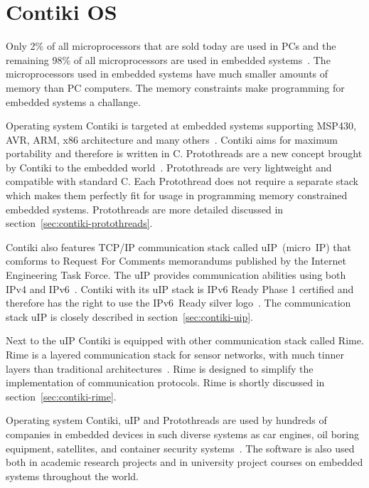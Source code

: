 
\chapter{Contiki OS}
Only 2\% of all microprocessors that are sold today are used in PCs and the remaining 98\%
of all microprocessors are used in embedded systems~\cite{thesis-programming}.
The microprocessors
used in embedded systems have much smaller amounts of memory than PC computers.
The memory constraints make programming for embedded systems a challange.

Operating system Contiki is targeted at embedded systems supporting MSP430, AVR, ARM, x86
architecture and many others~\cite{contiki-docs}.
Contiki aims for maximum portability and therefore is written in C.
Protothreads are a new concept brought by Contiki to the embedded world~\cite{paper-protothreads}.
Protothreads are very lightweight and compatible with standard C.
Each Protothread does not require a separate stack which makes them perfectly
fit for usage in programming memory constrained embedded systems.
Protothreads are more detailed discussed in section~\ref{sec:contiki-protothreads}.

Contiki also features TCP/IP communication stack called uIP~(micro~IP)
that comforms to Request For Comments memorandums published by the Internet Engineering Task Force.
The uIP provides communication abilities using both IPv4 and IPv6~\cite{contiki-docs}.
Contiki with its uIP stack is IPv6 Ready Phase 1 certified
and therefore has the right to use the IPv6~Ready silver logo~\cite{ipv6ready-db}.
The communication stack uIP is closely described in section~\ref{sec:contiki-uip}.

Next to the uIP Contiki is equipped with other communication stack called Rime.
Rime is a layered communication stack for sensor networks,
with much tinner layers than traditional architectures~\cite{paper-rime}.
Rime is designed to simplify the implementation of communication
protocols.
Rime is shortly discussed in section~\ref{sec:contiki-rime}.

Operating system Contiki, uIP and Protothreads are used by hundreds of companies in embedded devices in
such diverse systems as car engines, oil boring equipment, satellites, and container security systems~\cite{thesis-programming}.
The software is also used both in academic research
projects and in university project courses on embedded systems throughout the
world.

